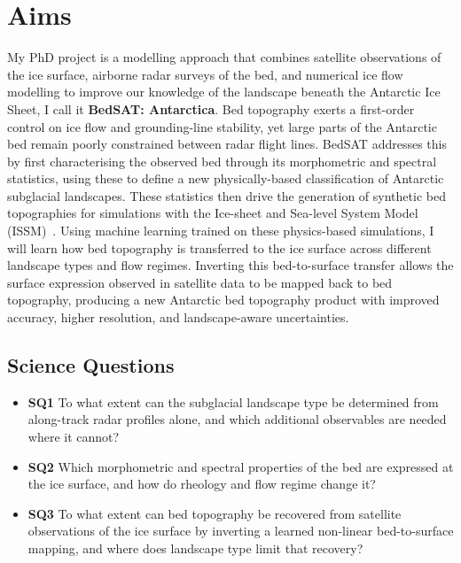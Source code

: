 \chapter{Aims}\label{aims}
My PhD project is a modelling approach that combines satellite observations of the ice surface, airborne radar surveys of the bed, and numerical ice flow modelling to improve our knowledge of the landscape beneath the Antarctic Ice Sheet, I call it \textbf{BedSAT: Antarctica}. Bed topography exerts a first-order control on ice flow and grounding-line stability, yet large parts of the Antarctic bed remain poorly constrained between radar flight lines. BedSAT addresses this by first characterising the observed bed through its morphometric and spectral statistics, using these to define a new physically-based classification of Antarctic subglacial landscapes. These statistics then drive the generation of synthetic bed topographies for simulations with the Ice-sheet and Sea-level System Model (ISSM)~\cite{Larour_2012}. Using machine learning trained on these physics-based simulations, I will learn how bed topography is transferred to the ice surface across different landscape types and flow regimes. Inverting this bed-to-surface transfer allows the surface expression observed in satellite data to be mapped back to bed topography, producing a new Antarctic bed topography product with improved accuracy, higher resolution, and landscape-aware uncertainties.

\section{Science Questions}
\begin{itemize}
\item{\textbf{SQ1}} To what extent can the subglacial landscape type be determined from along-track radar profiles alone, and which additional observables are needed where it cannot?
\item{\textbf{SQ2}} Which morphometric and spectral properties of the bed are expressed at the ice surface, and how do rheology and flow regime change it?
\item{\textbf{SQ3}} To what extent can bed topography be recovered from satellite observations of the ice surface by inverting a learned non-linear bed-to-surface mapping, and where does landscape type limit that recovery?
\end{itemize}

